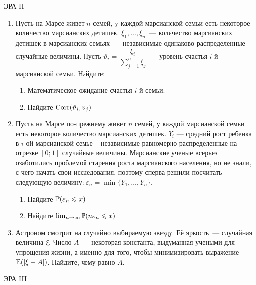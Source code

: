 \documentclass[12pt, a4paper]{article}\usepackage[]{graphicx}\usepackage[]{color}
\begin{document}
\begin{center}
ЭРА II
\end{center}

\begin{enumerate}
\item Пусть на Марсе живет $n$ семей, y каждой марсианской семьи есть некоторое количество марсианских детишек. $\xi_1, \ldots, \xi_n$~--- количество марсианских детишек в марсианских семьях~--- независимые одинаково распределенные случайные величины. Пусть $\vartheta_i = \dfrac{\xi_i}{\sum_{j = 1}^n \xi_j}$~--- уровень счастья $i$-й марсианской семьи. Найдите:

\begin{enumerate}
\item Математическое ожидание счастья $i$-й семьи.
\item Найдите $ \Corr (\vartheta_i, \vartheta_j)$
\end{enumerate}

\item Пусть на Марсе по-прежнему живет $n$ семей, у каждой марсианской семьи есть некоторое количество марсианских детишек. $Y_i$ — средний рост ребенка в $i$-ой марсианской семье -- независимые равномерно распределенные на отрезке $[0; 1]$ случайные величины. Марсианские ученые всерьез озаботились проблемой старения роста марсианского населения, но не знали, с чего начать свои исследования, поэтому сперва решили посчитать следующую величину:  $\varepsilon_n = \min \{Y_1, \ldots, Y_n\}$.

\begin{enumerate}
\item Найдите $\P (\varepsilon_n \leq x)$
\item Найдите $\lim_{n \rightarrow \infty} \P (n\varepsilon_n \leq x)$
\end{enumerate}

\item Астроном смотрит на случайно выбираемую звезду. Её яркость~--- случайная величина $\xi$. Число $A$~--- некоторая константа, выдуманная учеными для упрощения жизни, а именно для того, чтобы минимизировать выражение $\E(|\xi - A|)$. Найдите, чему равно $A$.
\end{enumerate}


\begin{center}
ЭРА III
\end{center}
\end{document}
